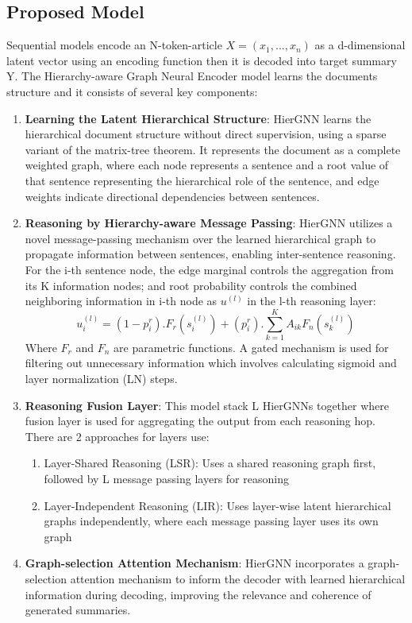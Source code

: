\documentclass{article}
\begin{document}
\subsection{Proposed Model}
Sequential models encode an N-token-article $X = (x_1, ..., x_n)$ as a d-dimensional latent vector using an encoding function then it is decoded into target summary Y. The Hierarchy-aware Graph Neural Encoder model learns the documents structure and it consists of several key components:
\begin{enumerate}
    \item \textbf{Learning the Latent Hierarchical Structure}: HierGNN learns the hierarchical document structure without direct supervision, using a sparse variant of the matrix-tree theorem. It represents the document as a complete weighted graph, where each node represents a sentence and a root value of that sentence representing the hierarchical role of the sentence, and edge weights indicate directional dependencies between sentences.
    \item \textbf{Reasoning by Hierarchy-aware Message Passing}: HierGNN utilizes a novel message-passing mechanism over the learned hierarchical graph to propagate information between sentences, enabling inter-sentence reasoning. For the i-th sentence node, the edge marginal controls the aggregation from its
        K information nodes; and root probability controls the combined neighboring information in i-th node as $u^{(l)}$ in the l-th reasoning layer: $$u_i^{(l)} = (1 - p_i^r) . F_r(s_i^{(l)}) + (p_i^r) . \sum_{k=1}^{K} A_{ik}F_n(s_k^{(l)})$$ Where $F_r$ and $F_n$ are parametric functions. A gated mechanism is used for filtering out unnecessary information which involves calculating sigmoid and layer normalization (LN) steps.
    \item \textbf{Reasoning Fusion Layer}: This model stack L HierGNNs together where fusion layer is used for aggregating the output from each reasoning hop. There are 2 approaches for layers use:
        \begin{enumerate}
          \item Layer-Shared Reasoning (LSR): Uses a shared reasoning graph first, followed by L message passing layers for reasoning
          \item Layer-Independent Reasoning (LIR): Uses layer-wise latent hierarchical graphs independently, where each message passing layer uses its own graph
        \end{enumerate}
    \item \textbf{Graph-selection Attention Mechanism}: HierGNN incorporates a graph-selection attention mechanism to inform the decoder with learned hierarchical information during decoding, improving the relevance and coherence of generated summaries.
\end{enumerate}
\end{document}

